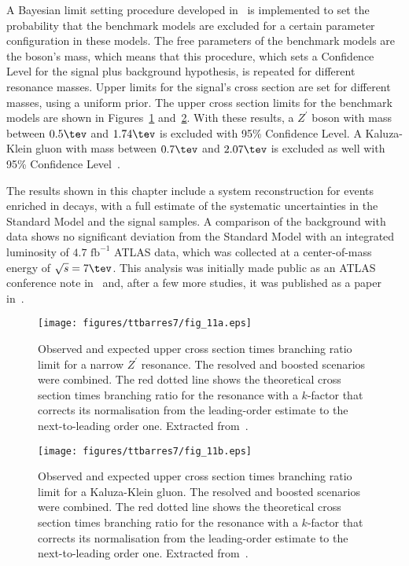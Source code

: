A Bayesian limit setting procedure developed in~\cite{limitsetting} is implemented
to set the probability that the benchmark models are excluded for a certain parameter configuration in these models.
The free parameters of the benchmark models are the boson's mass, which means that this procedure, which sets a Confidence Level for the signal plus background hypothesis,
is repeated for different \ttbar resonance masses. Upper limits for the signal's cross section are set for different masses, using a uniform prior. The upper
cross section limits for the benchmark models are shown in Figures~\ref{fig:ttbarres7_limitzp} and~\ref{fig:ttbarres7_limitkkg}. With these results, a $Z^{\prime}$
boson with mass between $0.5\tev$ and $1.74\tev$ is excluded with 95\% Confidence Level.
A Kaluza-Klein gluon with mass between $0.7\tev$ and $2.07\tev$ is excluded as well with 95\%
Confidence Level~\cite{ttres7paper}.

The results shown in this chapter include a \ttbar system reconstruction for events enriched in \ttbar decays, with a full estimate of the systematic uncertainties
in the Standard Model and the signal samples. A comparison of the background with data shows no significant deviation from the Standard Model with
an integrated luminosity of $4.7 \textrm{ fb}^{-1}$ ATLAS data, which was
collected at a center-of-mass energy of $\sqrt{s} = 7\tev$. This analysis was initially made public as an ATLAS conference note in~\cite{ttres7note} and,
after a few more studies, it was published as a paper in~\cite{ttres7paper}.

\begin{figure}
\centering
\texttt{[image: figures/ttbarres7/fig\_11a.eps]}
\caption{Observed and expected upper cross section times branching ratio limit for a narrow $Z^{\prime}$ resonance. The resolved and boosted scenarios were combined. The red dotted line shows the theoretical cross section times branching ratio for the resonance with a $k$-factor that corrects its normalisation from the leading-order estimate to the next-to-leading order one. Extracted from~\cite{ttres7paper}.}
\label{fig:ttbarres7_limitzp}
\end{figure}

\begin{figure}
\centering
\texttt{[image: figures/ttbarres7/fig\_11b.eps]}
\caption{Observed and expected upper cross section times branching ratio limit for a Kaluza-Klein gluon. The resolved and boosted scenarios were combined. The red dotted line shows the theoretical cross section times branching ratio for the resonance with a $k$-factor that corrects its normalisation from the leading-order estimate to the next-to-leading order one. Extracted from~\cite{ttres7paper}.}
\label{fig:ttbarres7_limitkkg}
\end{figure}

